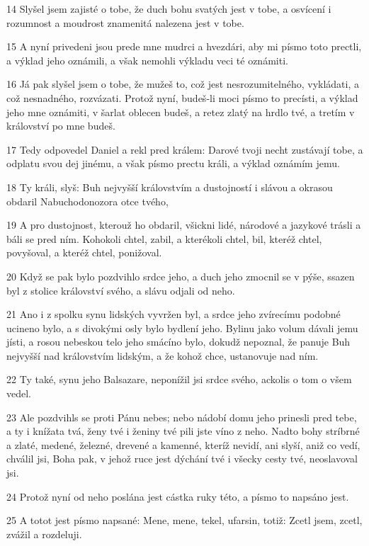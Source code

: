 \par 14 Slyšel jsem zajisté o tobe, že duch bohu svatých jest v tobe, a osvícení i rozumnost a moudrost znamenitá nalezena jest v tobe.
\par 15 A nyní privedeni jsou prede mne mudrci a hvezdári, aby mi písmo toto prectli, a výklad jeho oznámili, a však nemohli výkladu veci té oznámiti.
\par 16 Já pak slyšel jsem o tobe, že mužeš to, což jest nesrozumitelného, vykládati, a což nesnadného, rozvázati. Protož nyní, budeš-li moci písmo to precísti, a výklad jeho mne oznámiti, v šarlat oblecen budeš, a retez zlatý na hrdlo tvé, a tretím v království po mne budeš.
\par 17 Tedy odpovedel Daniel a rekl pred králem: Darové tvoji necht zustávají tobe, a odplatu svou dej jinému, a však písmo prectu králi, a výklad oznámím jemu.
\par 18 Ty králi, slyš: Buh nejvyšší královstvím a dustojností i slávou a okrasou obdaril Nabuchodonozora otce tvého,
\par 19 A pro dustojnost, kterouž ho obdaril, všickni lidé, národové a jazykové trásli a báli se pred ním. Kohokoli chtel, zabil, a kterékoli chtel, bil, kteréž chtel, povyšoval, a kteréž chtel, ponižoval.
\par 20 Když se pak bylo pozdvihlo srdce jeho, a duch jeho zmocnil se v pýše, ssazen byl z stolice království svého, a slávu odjali od neho.
\par 21 Ano i z spolku synu lidských vyvržen byl, a srdce jeho zvírecímu podobné ucineno bylo, a s divokými osly bylo bydlení jeho. Bylinu jako volum dávali jemu jísti, a rosou nebeskou telo jeho smácíno bylo, dokudž nepoznal, že panuje Buh nejvyšší nad královstvím lidským, a že kohož chce, ustanovuje nad ním.
\par 22 Ty také, synu jeho Balsazare, neponížil jsi srdce svého, ackolis o tom o všem vedel.
\par 23 Ale pozdvihls se proti Pánu nebes; nebo nádobí domu jeho prinesli pred tebe, a ty i knížata tvá, ženy tvé i ženiny tvé pili jste víno z neho. Nadto bohy stríbrné a zlaté, medené, železné, drevené a kamenné, kteríž nevidí, ani slyší, aniž co vedí, chválil jsi, Boha pak, v jehož ruce jest dýchání tvé i všecky cesty tvé, neoslavoval jsi.
\par 24 Protož nyní od neho poslána jest cástka ruky této, a písmo to napsáno jest.
\par 25 A totot jest písmo napsané: Mene, mene, tekel, ufarsin, totiž: Zcetl jsem, zcetl, zvážil a rozdeluji.
